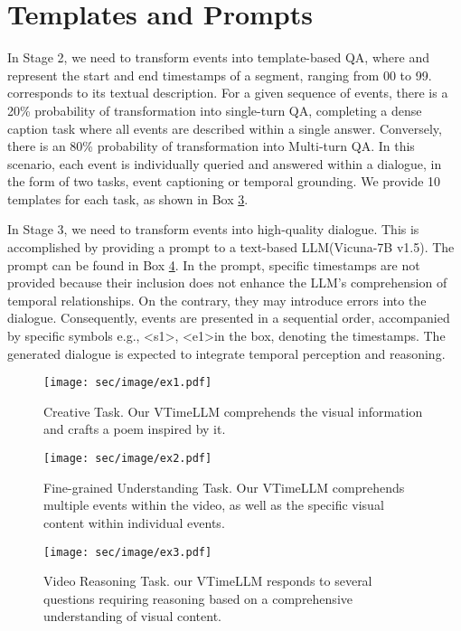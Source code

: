 \documentclass[10pt,twocolumn,letterpaper]{article}
\begin{document}
\section{Templates and Prompts}


In Stage 2, we need to transform events  into template-based QA, where  and  represent the start and end timestamps of a segment, ranging from 00 to 99.  corresponds to its textual description.  For a given sequence of events, there is a 20\% probability of transformation into single-turn QA, completing a dense caption task where all events are described within a single answer. Conversely, there is an 80\% probability of transformation into Multi-turn QA. In this scenario, each event is individually queried and answered within a dialogue, in the form of two tasks, event captioning or temporal grounding. We provide 10 templates for each task, as shown in Box \hyperlink{box3}{3}.


In Stage 3, we need to transform events into high-quality dialogue. This is accomplished by providing a prompt to a text-based LLM(Vicuna-7B v1.5). The prompt can be found in Box \hyperlink{box4}{4}. In the prompt, specific timestamps are not provided because their inclusion does not enhance the LLM's comprehension of temporal relationships. On the contrary, they may introduce errors into the dialogue. Consequently, events are presented in a sequential order, accompanied by specific symbols e.g., \textless s1\textgreater, \textless e1\textgreater in the box, denoting the timestamps. The generated dialogue is expected to integrate temporal perception and reasoning.


\begin{figure}[htbp]
  \centering
  \texttt{[image: sec/image/ex1.pdf]}
  \caption{Creative Task. Our VTimeLLM comprehends the visual information and crafts a poem inspired by it.}
  \label{fig:ex1}
\end{figure}


\begin{figure}[htbp]
  \centering
  \texttt{[image: sec/image/ex2.pdf]}
  \caption{Fine-grained Understanding Task. Our VTimeLLM comprehends multiple events within the video, as well as the specific visual content within individual events.}
  \label{fig:ex2}
\end{figure}


\begin{figure}[htbp]
  \centering
  \texttt{[image: sec/image/ex3.pdf]}
  \caption{Video Reasoning Task. our VTimeLLM responds to several questions requiring reasoning based on a comprehensive understanding of visual content.}
  \label{fig:ex3}
\end{figure}
\end{document}
